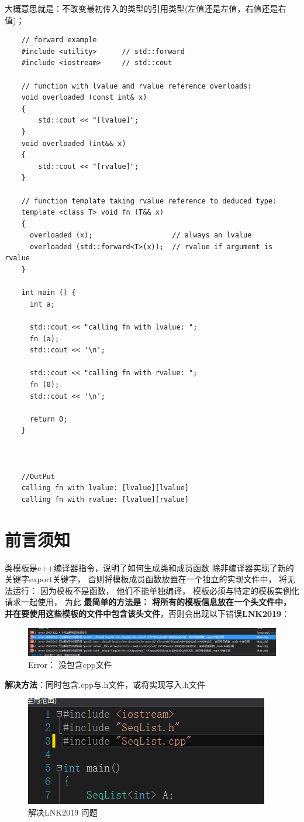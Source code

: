 \documentclass[UTF8,a4paper,12pt]{ctexbook}
\begin{document}
		大概意思就是：不改变最初传入的类型的引用类型(左值还是左值，右值还是右值)；
		\begin{lstlisting}
	// forward example
	#include <utility>      // std::forward
	#include <iostream>     // std::cout
	
	// function with lvalue and rvalue reference overloads:
	void overloaded (const int& x) 
	{
		std::cout << "[lvalue]";
	}
	void overloaded (int&& x) 
	{
		std::cout << "[rvalue]";
	}
	
	// function template taking rvalue reference to deduced type:
	template <class T> void fn (T&& x) 
	{
	  overloaded (x);                   // always an lvalue
	  overloaded (std::forward<T>(x));  // rvalue if argument is rvalue
	}
	
	int main () {
	  int a;
	
	  std::cout << "calling fn with lvalue: ";
	  fn (a);
	  std::cout << '\n';
	
	  std::cout << "calling fn with rvalue: ";
	  fn (0);
	  std::cout << '\n';
	
	  return 0;
	}
	
	
	
	//OutPut
	calling fn with lvalue: [lvalue][lvalue]
	calling fn with rvalue: [lvalue][rvalue]
		\end{lstlisting}

\section{前言须知}
	类模板是c++编译器指令，说明了如何生成类和成员函数 除非编译器实现了新的关键字export关键字， 否则将模板成员函数放置在一个独立的实现文件中， 将无法运行： 因为模板不是函数， 他们不能单独编译， 模板必须与特定的模板实例化请求一起使用， 为此 \textbf{最简单的方法是： }\textbf{将所有的模板信息放在一个头文件中， 并在要使用这些模板的文件中包含该头文件}，否则会出现以下错误\textbf{LNK2019}：
	
		\begin{figure}[h]
			\centering
			\includegraphics[width = 14cm]{MustKnowError.png}
			\caption{Error： 没包含cpp文件}
		\end{figure}
		
	\textbf{解决方法}：同时包含.cpp与.h文件，或将实现写入.h文件
		\begin{figure}[h]
			\centering
			\includegraphics[scale = 0.6]{TemplateFirst.png}
			\caption{解决LNK2019 问题}
		\end{figure}	
 
\end{document}

